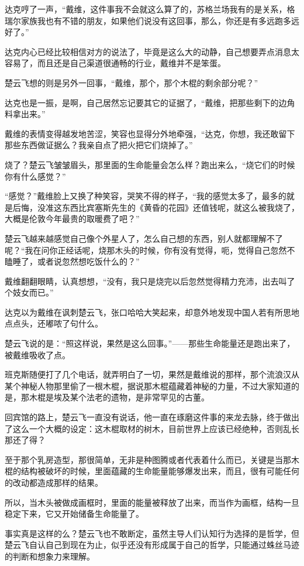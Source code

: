 达克哼了一声，“戴维，这件事我不会就这么算了的，苏格兰场我有的是关系，格瑞尔家族我也有不错的朋友，如果他们说没有这回事，那么，你还是有多远跑多远好了。”

达克内心已经比较相信对方的说法了，毕竟是这么大的动静，自己想要弄点消息太容易了，而且还是自己渠道很通畅的行业，戴维并不是笨蛋。

楚云飞想的则是另外一回事，“戴维，那个，那个木棍的剩余部分呢？”

达克也是一振，是啊，自己居然忘记要其它的证据了，“戴维，把那些剩下的边角料拿出来。”

戴维的表情变得越发地苦涩，笑容也显得分外地牵强，“达克，你想，我还敢留下那些东西做证据么？我亲自点了把火把它们烧掉了。”

烧了？楚云飞皱皱眉头，那里面的生命能量会怎么样？跑出来么，“烧它们的时候你有什么感觉？”

“感觉？”戴维脸上又换了种笑容，哭笑不得的样子，“我的感觉太多了，最多的就是后悔，没准这东西比宾塞斯先生的《黄昏的花园》还值钱呢，就这么被我烧了，大概是伦敦今年最贵的取暖费了吧？”

楚云飞越来越感觉自己像个外星人了，怎么自己想的东西，别人就都理解不了呢？“我在问你正经话呢，烧那木头的时候，你有没有觉得，呃，觉得自己忽然不瞌睡了，或者说忽然想吃饭什么的？”

戴维翻翻眼睛，认真想想，“没有，我只是烧完以后忽然觉得精力充沛，出去叫了个妓女而已。”

达克以为戴维在讽刺楚云飞，张口哈哈大笑起来，却意外地发现中国人若有所思地点点头，还嘟哝了句什么。

楚云飞说的是：“照这样说，果然是这么回事。”——那些生命能量还是跑出来了，被戴维吸收了点。

班克斯随便打了几个电话，就弄明白了一切，果然是戴维说的那样，那个流浪汉从某个神秘人物那里偷了一根木棍，据说那木棍蕴藏着神秘的力量，不过大家知道的是，那木棍是埃及某个法老的遗物，是非常罕见的古董。

回宾馆的路上，楚云飞一直没有说话，他一直在琢磨这件事的来龙去脉，终于做出了这么一个大概的设定：这木棍取材的树木，目前世界上应该已经绝种，否则乱长那还了得？

至于那个乳房造型，那很简单，无非是种图腾或者代表着什么而已，关键是当那木棍的结构被破坏的时候，里面蕴藏的生命能量能够爆发出来，而且，很有可能任何的改动都造成那样的结果。

所以，当木头被做成画框时，里面的能量被释放了出来，而当作为画框，结构一旦稳定下来，它又开始储备生命能量了。

事实真是这样的么？楚云飞也不敢断定，虽然主导人们认知行为选择的是哲学，但楚云飞自认自己到现在为止，似乎还没有形成属于自己的哲学，只能通过蛛丝马迹的判断和想象力来理解。

